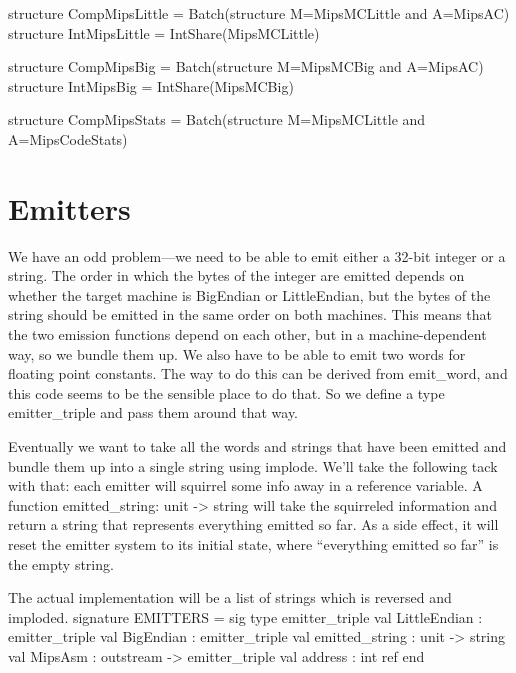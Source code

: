 structure CompMipsLittle = Batch(structure M=MipsMCLittle and A=MipsAC)
structure IntMipsLittle = IntShare(MipsMCLittle)

structure CompMipsBig = Batch(structure M=MipsMCBig and A=MipsAC)
structure IntMipsBig = IntShare(MipsMCBig)

structure CompMipsStats = Batch(structure M=MipsMCLittle and A=MipsCodeStats)
\endcode
{}
\section{Emitters}
We have an odd problem---we need to be able to emit either a 32-bit
integer or a string.
The order in which the bytes of the integer are emitted depends on
whether the target machine is BigEndian or LittleEndian, but the
bytes of the string should be emitted in the same order on both machines.
This means that the two emission functions depend on each other, but
in a machine-dependent way, so we bundle them up.
We also have to be able to emit two words for floating point constants.
The way to do this can be derived from \code{}emit_word\edoc{}, and this
code seems to be the sensible place to do that.
So we define a type \code{}emitter_triple\edoc{} 
and pass them around that way.

\enddocs
{}
Eventually we want to take all the words and strings that have been
emitted and bundle them up into a single string using \code{}implode\edoc{}.
We'll take the following tack with that:
each emitter will squirrel some info away in a reference variable.
A function \code{}emitted_string: unit -> string\edoc{} will take the
squirreled information and return a string that represents
everything emitted so far.
As a side effect, it will reset the emitter system to its initial 
state, where ``everything emitted so far'' is the empty string.

The actual implementation will be a list of strings which is reversed 
and imploded.
\enddocs
{}
\endmoddef
signature EMITTERS = sig
    type emitter_triple
    val LittleEndian : emitter_triple
    val BigEndian : emitter_triple
    val emitted_string : unit -> string
    val MipsAsm : outstream -> emitter_triple
    val address : int ref
end

